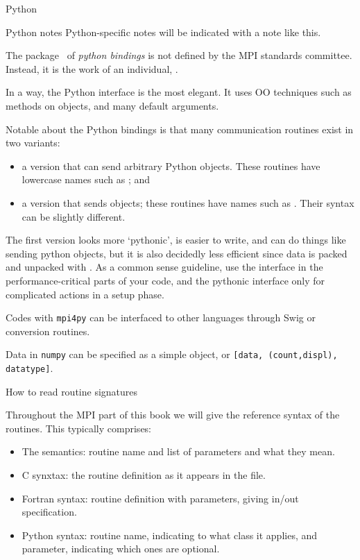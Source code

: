 

 {Python}
\label{sec:python-bind}

\begin{pythonnote}{Python notes}
  Python-specific notes will be indicated with a note like this.
\end{pythonnote}

The  package~\cite{mpi4py:homepage} of \emph{python bindings}
is not defined by the MPI
standards committee. Instead, it is the work of an individual,
.

In a way, the Python interface is the most elegant. It uses \ac{OO}
techniques such as methods on objects, and many default arguments.

Notable about the Python bindings is that many communication routines
exist in two variants:
\begin{itemize}
\item a version that can send arbitrary Python objects. These routines
  have lowercase names such as ; and
\item a version that sends  objects; these routines
  have names such as . Their syntax can be slightly different.
\end{itemize}
The first version looks more `pythonic', is easier to write,
and can do things like sending python objects,
but it is also decidedly less efficient since data is packed
and unpacked with . As a common sense guideline,
use the  interface in the performance-critical parts
of your code, and the pythonic interface only for complicated
actions in a setup phase.

Codes with \texttt{mpi4py} can be interfaced to other languages
through Swig or conversion routines.

Data in \texttt{numpy} can be specified as a simple object,
or \texttt{[data, (count,displ), datatype]}.


 {How to read routine signatures}
\label{sec:protos}

Throughout the MPI part of this book we will give the reference syntax
of the routines. This typically comprises:
\begin{itemize}
\item The semantics: routine name and list of parameters and what they
  mean.
\item C synxtax: the routine definition as it appears in the
   file.
\item Fortran syntax: routine definition with parameters, giving
  in/out specification.
\item Python syntax: routine name, indicating to what class it
  applies, and parameter, indicating which ones are optional.
\end{itemize}

